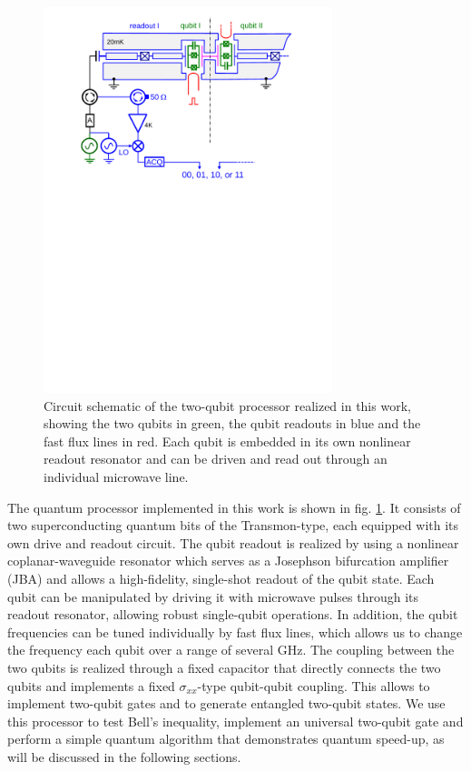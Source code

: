 \begin{figure}[ht!]
	\centering
		\includegraphics[width=0.75\textwidth]{./material/papers/grover/figures/2_qubit_processor_schematic}
	\caption[Circuit schematic of the realized two-qubit processor]{Circuit schematic of the two-qubit processor realized in this work, showing the two qubits in green, the qubit readouts in blue and the fast flux lines in red. Each qubit is embedded in its own nonlinear readout resonator and can be driven and read out through an individual microwave line.}
	\label{fig:two_qubit_processor_schematic}
\end{figure}

The quantum processor implemented in this work is shown in fig. \ref{fig:two_qubit_processor_schematic}. It consists of two superconducting quantum bits of the Transmon-type, each equipped with its own drive and readout circuit. The qubit readout is realized by using a nonlinear coplanar-waveguide resonator which serves as a Josephson bifurcation amplifier (JBA) and allows a high-fidelity, single-shot readout of the qubit state. Each qubit can be manipulated by driving it with microwave pulses through its readout resonator, allowing robust single-qubit operations. In addition, the qubit frequencies can be tuned individually by fast flux lines, which allows us to change the frequency each qubit over a range of several GHz. The coupling between the two qubits is realized through a fixed capacitor that directly connects the two qubits and implements a fixed $\sigma_{xx}$-type qubit-qubit coupling. This allows to implement two-qubit gates and to generate entangled two-qubit states. We use this processor to test Bell's inequality, implement an universal two-qubit gate and perform a simple quantum algorithm that demonstrates quantum speed-up, as will be discussed in the following sections.

